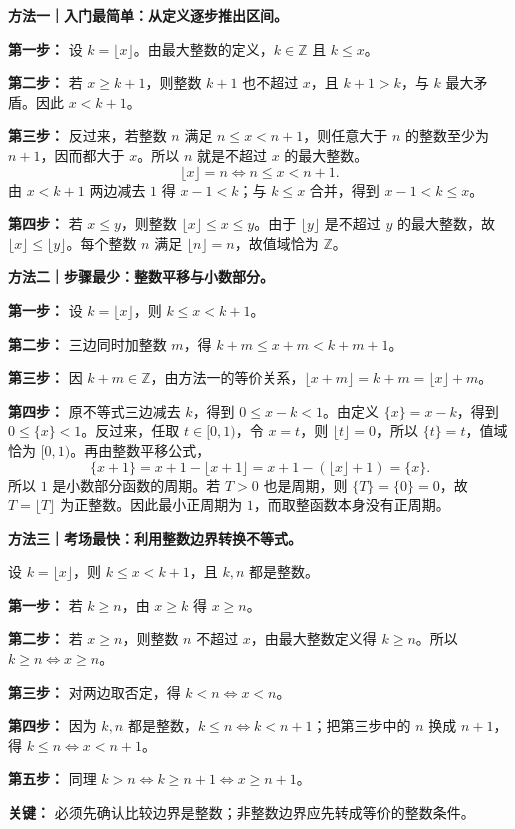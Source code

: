 \clearpage
\begin{proofbox}
\textbf{方法一｜入门最简单：从定义逐步推出区间。}

\textbf{第一步：} 设 $k=\lfloor x\rfloor$。由最大整数的定义，$k\in\mathbb Z$ 且 $k\le x$。

\textbf{第二步：} 若 $x\ge k+1$，则整数 $k+1$ 也不超过 $x$，且 $k+1>k$，与 $k$ 最大矛盾。因此 $x<k+1$。

\textbf{第三步：} 反过来，若整数 $n$ 满足 $n\le x<n+1$，则任意大于 $n$ 的整数至少为 $n+1$，因而都大于 $x$。所以 $n$ 就是不超过 $x$ 的最大整数。
\[\boxed{\lfloor x\rfloor=n\iff n\le x<n+1.}\]
由 $x<k+1$ 两边减去 $1$ 得 $x-1<k$；与 $k\le x$ 合并，得到 $x-1<k\le x$。

\textbf{第四步：} 若 $x\le y$，则整数 $\lfloor x\rfloor\le x\le y$。由于 $\lfloor y\rfloor$ 是不超过 $y$ 的最大整数，故 $\lfloor x\rfloor\le\lfloor y\rfloor$。每个整数 $n$ 满足 $\lfloor n\rfloor=n$，故值域恰为 $\mathbb Z$。
\end{proofbox}
\clearpage
\begin{proofbox}
\textbf{方法二｜步骤最少：整数平移与小数部分。}

\textbf{第一步：} 设 $k=\lfloor x\rfloor$，则 $k\le x<k+1$。

\textbf{第二步：} 三边同时加整数 $m$，得 $k+m\le x+m<k+m+1$。

\textbf{第三步：} 因 $k+m\in\mathbb Z$，由方法一的等价关系，$\lfloor x+m\rfloor=k+m=\lfloor x\rfloor+m$。

\textbf{第四步：} 原不等式三边减去 $k$，得到 $0\le x-k<1$。由定义 $\{x\}=x-k$，得到 $0\le\{x\}<1$。反过来，任取 $t\in[0,1)$，令 $x=t$，则 $\lfloor t\rfloor=0$，所以 $\{t\}=t$，值域恰为 $[0,1)$。再由整数平移公式，
\[\{x+1\}=x+1-\lfloor x+1\rfloor=x+1-(\lfloor x\rfloor+1)=\{x\}.\]
所以 $1$ 是小数部分函数的周期。若 $T>0$ 也是周期，则 $\{T\}=\{0\}=0$，故 $T=\lfloor T\rfloor$ 为正整数。因此最小正周期为 $1$，而取整函数本身没有正周期。
\end{proofbox}
\clearpage
\begin{proofbox}
\textbf{方法三｜考场最快：利用整数边界转换不等式。}

设 $k=\lfloor x\rfloor$，则 $k\le x<k+1$，且 $k,n$ 都是整数。

\textbf{第一步：} 若 $k\ge n$，由 $x\ge k$ 得 $x\ge n$。

\textbf{第二步：} 若 $x\ge n$，则整数 $n$ 不超过 $x$，由最大整数定义得 $k\ge n$。所以 $k\ge n\iff x\ge n$。

\textbf{第三步：} 对两边取否定，得 $k<n\iff x<n$。

\textbf{第四步：} 因为 $k,n$ 都是整数，$k\le n\iff k<n+1$；把第三步中的 $n$ 换成 $n+1$，得 $k\le n\iff x<n+1$。

\textbf{第五步：} 同理 $k>n\iff k\ge n+1\iff x\ge n+1$。

\textbf{关键：} 必须先确认比较边界是整数；非整数边界应先转成等价的整数条件。
\end{proofbox}
